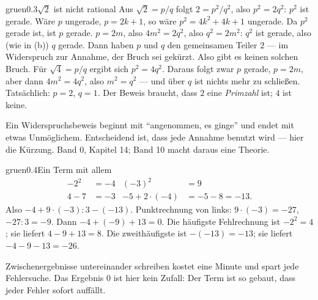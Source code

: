 \begin{loesungkarte}{gruen}{0.3}{$\sqrt2$ ist nicht rational}
Aus $\sqrt2 = p/q$ folgt $2 = p^{2}/q^{2}$, also $p^{2} = 2q^{2}$: $p^{2}$ ist gerade.
Wäre $p$ ungerade, $p = 2k + 1$, so wäre $p^{2} = 4k^{2} + 4k + 1$ ungerade. Da $p^{2}$ gerade ist, ist $p$ gerade.
$p = 2m$, also $4m^{2} = 2q^{2}$, also $q^{2} = 2m^{2}$: $q^{2}$ ist gerade, also (wie in (b)) $q$ gerade. Dann haben $p$ und $q$ den gemeinsamen Teiler $2$ --- im Widerspruch zur Annahme, der Bruch sei gekürzt. Also gibt es keinen solchen Bruch.
Für $\sqrt4 = p/q$ ergibt sich $p^{2} = 4q^{2}$. Daraus folgt zwar $p$ gerade, $p = 2m$, aber dann $4m^{2} = 4q^{2}$, also $m^{2} = q^{2}$ --- und über $q$ ist nichts mehr zu schließen. Tatsächlich: $p = 2$, $q = 1$. Der Beweis braucht, dass $2$ eine \emph{Primzahl} ist; $4$ ist keine.
\begin{mitnehmen}\kastentext
Ein Widerspruchsbeweis beginnt mit \enquote{angenommen, es ginge} und endet mit etwas Unmöglichem. Entscheidend ist, dass jede Annahme benutzt wird --- hier die Kürzung. Band 0, Kapitel 14; Band 10 macht daraus eine Theorie.
\end{mitnehmen}
\end{loesungkarte}

\begin{loesungkarte}{gruen}{0.4}{Ein Term mit allem}
\begin{align*}
-2^{2} &= -4 & (-3)^{2} &= 9\\
4 - 7 &= -3 & -5 + 2\cdot(-4) &= -5 - 8 = -13 .
\end{align*}
Also $-4 + 9\cdot(-3) : 3 - (-13)$. Punktrechnung von links: $9\cdot(-3) = -27$, $-27 : 3 = -9$. Dann $-4 + (-9) + 13 = 0$.
Die häufigste Fehlrechnung ist $-2^{2} = 4$; sie liefert $4 - 9 + 13 = 8$. Die zweithäufigste ist $-(-13) = -13$; sie liefert $-4 - 9 - 13 = -26$.
\begin{mitnehmen}\kastentext
Zwischenergebnisse untereinander schreiben kostet eine Minute und spart jede Fehlersuche. Das Ergebnis $0$ ist hier kein Zufall: Der Term ist so gebaut, dass jeder Fehler sofort auffällt.
\end{mitnehmen}
\end{loesungkarte}

